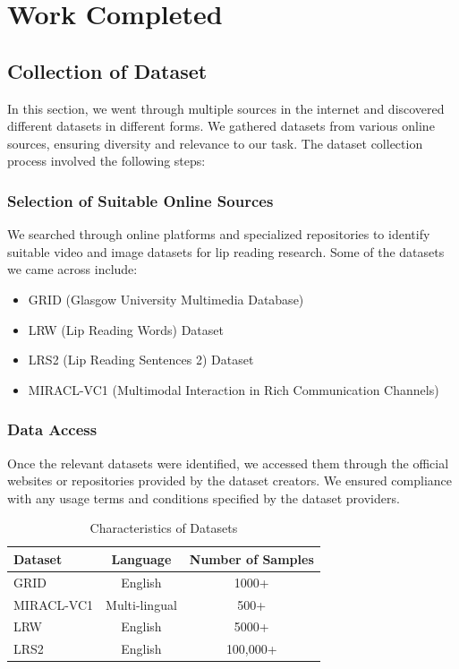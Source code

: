 	\chapter{Work Completed}

        \section{Collection of Dataset}

        In this section, we went through multiple sources in the internet and discovered different datasets in different forms. We gathered datasets from various online sources, ensuring diversity and relevance to our task. The dataset collection process involved the following steps:

        \subsection{Selection of Suitable Online Sources}
        We searched through online platforms and specialized repositories to identify suitable video and image datasets for lip reading research. Some of the datasets we came across include:

        \begin{itemize}
            \item GRID (Glasgow University Multimedia Database)
            \item LRW (Lip Reading Words) Dataset
            \item LRS2 (Lip Reading Sentences 2) Dataset
            \item MIRACL-VC1 (Multimodal Interaction in Rich Communication Channels)
        \end{itemize}

        \subsection{Data Access}
        Once the relevant datasets were identified, we accessed them through the official websites or repositories provided by the dataset creators. We ensured compliance with any usage terms and conditions specified by the dataset providers.
        
        \begin{table}[h]
            \centering
            \label{table:dataset_characteristics}
            \begin{tabular}{|l|c|c|}
                \hline
                \textbf{Dataset} & \textbf{Language} & \textbf{Number of Samples} \\
                \hline
                    GRID & English & 1000+ \\
                    MIRACL-VC1 & Multi-lingual & 500+ \\
                    LRW & English & 5000+ \\
                    LRS2 & English & 100,000+ \\
                    
                \hline
            \end{tabular}
        \caption{Characteristics of Datasets}
        \end{table}
